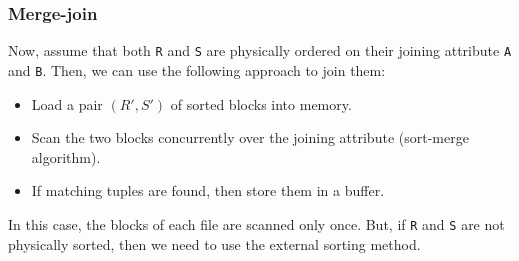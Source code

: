 \documentclass[a4paper, openany]{memoir}
\theoremstyle{definition}
\theoremstyle{plain}
\begin{document}
\subsubsection{Merge-join}
Now, assume that both \texttt{R} and \texttt{S} are physically ordered on their joining attribute \texttt{A} and \texttt{B}. Then, we can use the following approach to join them:
\begin{itemize}
    \item Load a pair $(R', S')$ of sorted blocks into memory.
    \item Scan the two blocks concurrently over the joining attribute (sort-merge algorithm).
    \item If matching tuples are found, then store them in a buffer.
\end{itemize}
In this case, the blocks of each file are scanned only once. But, if \texttt{R} and \texttt{S} are not physically sorted, then we need to use the external sorting method.
\end{document}

